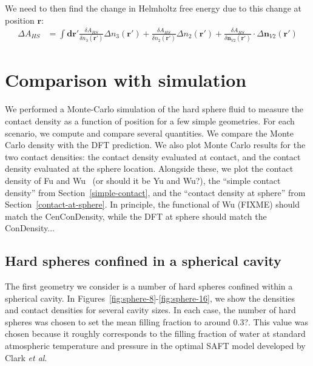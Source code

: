 \documentclass[letterpaper,twocolumn,amsmath,amssymb,prb]{revtex4-1}
\begin{document}
\begin{widetext}
We need to then find the change in Helmholtz free energy due to this
change at position $\mathbf{r}$:
\begin{align}
  \Delta A_{HS} &= \int \mathbf{dr}'
  \frac{\delta A_{HS}}{\delta n_3(\mathbf{r}')}\Delta n_3(\mathbf{r}')
  +
  \frac{\delta A_{HS}}{\delta n_2(\mathbf{r}')}\Delta n_2(\mathbf{r}')
  +
  \frac{\delta A_{HS}}{\delta \mathbf{n}_{V2}(\mathbf{r}')} \cdot \Delta \mathbf{n}_{V2}(\mathbf{r}')
\end{align}

\end{widetext}

\section{Comparison with simulation}

We performed a Monte-Carlo simulation of the hard sphere fluid to
measure the contact density as a function of position for a few simple
geometries.  For each scenario, we compute and compare several
quantities.  We compare the Monte Carlo density with the DFT
prediction.  We also plot Monte Carlo results for the two contact
densities: the contact density evaluated at contact, and the contact
density evaluated at the sphere location.  Alongside these, we plot
the contact density of Fu and Wu~\cite{fu2005vapor-liquid-dft} (or
should it be Yu and
Wu\cite{yu2002fmt-dft-inhomogeneous-associating}?), the ``simple
contact density'' from Section~\ref{simple-contact}, and the ``contact
density at sphere'' from Section~\ref{contact-at-sphere}.  In
principle, the functional of Wu (FIXME) should match the
CenConDensity, while the DFT at sphere should match the ConDensity...

\subsection{Hard spheres confined in a spherical cavity}

The first geometry we consider is a number of hard spheres confined
within a spherical cavity.  In
Figures~\ref{fig:sphere-8}-\ref{fig:sphere-16}, we show
the densities and contact densities for several cavity sizes.  In each
case, the number of hard spheres was chosen to set the mean filling
fraction to around 0.3?.  This value was chosen because it roughly
corresponds to the filling fraction of water at standard atmospheric
temperature and pressure in the optimal SAFT model developed by Clark
\emph{et al}\cite{clark2006developing}.
\end{document}
